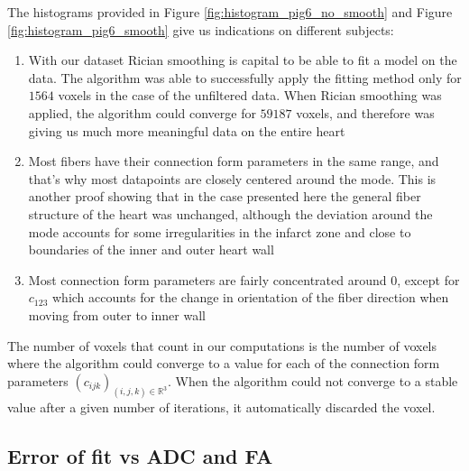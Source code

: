 The histograms provided in Figure \ref{fig:histogram_pig6_no_smooth} and Figure \ref{fig:histogram_pig6_smooth} give us indications on different subjects:
\begin{enumerate}
    \item With our dataset Rician smoothing is capital to be able to fit a model on the data. The algorithm was able to successfully apply the fitting method only for $1564$ voxels in the case of the unfiltered data. When Rician smoothing was applied, the algorithm could converge for $59187$ voxels, and therefore was giving us much more meaningful data on the entire heart
    \item Most fibers have their connection form parameters in the same range, and that's why most datapoints are closely centered around the mode. This is another proof showing that in the case presented here the general fiber structure of the heart was unchanged, although the deviation around the mode accounts for some irregularities in the infarct zone and close to boundaries of the inner and outer heart wall
    \item Most connection form parameters are fairly concentrated around 0, except for $c_{123}$ which accounts for the change in orientation of the fiber direction when moving from outer to inner wall
\end{enumerate}
The number of voxels that count in our computations is the number of voxels where the algorithm could converge to a value for each of the connection form parameters $(c_{ijk})_{(i, j, k) \in \mathbb{R}^3}$. When the algorithm could not converge to a stable value after a given number of iterations, it automatically discarded the voxel.

\subsection{Error of fit vs ADC and FA}


